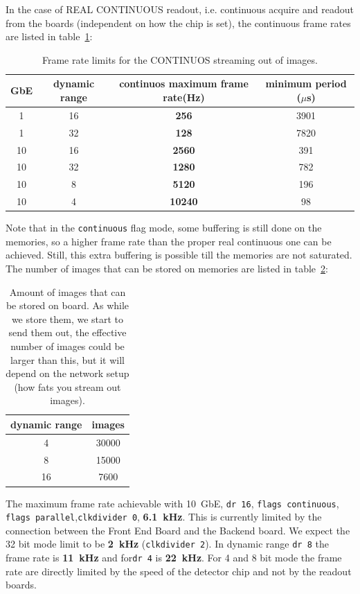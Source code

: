 \documentclass{article}
\begin{document}
In the case of REAL CONTINUOUS readout, i.e. continuous acquire and readout from the boards (independent on how the chip is set), the continuous frame rates are listed in table~\ref{tcont}:
\begin{table} 
\begin{tabular}{|c|c|c|c|}
\hline
GbE & dynamic range & continuos maximum frame rate(Hz) & minimum period ($\mu$s)\\
\hline
1 & 16 &  \textbf{256} & 3901\\ 
\hline 
1 &  32 &  \textbf{128} & 7820\\
\hline 
10 & 16 & \textbf{2560} & 391\\  
\hline 
10 & 32 & \textbf{1280}& 782\\  
\hline 
10 & 8 & \textbf{5120} & 196\\
\hline
10 & 4 & \textbf{10240} & 98\\
\hline
\end{tabular}
\caption{Frame rate limits for the CONTINUOS streaming out of images.} 
\label{tcont}\end{table}
Note that in the {\tt{continuous}} flag mode, some buffering is still done on the memories, so a higher frame rate than the proper real continuous one can be achieved. Still, this extra buffering is possible till the memories are not saturated. 
The number of images that can be stored on memories are listed in table~\ref{timgs}:
\begin{table}
\begin{tabular}{|c|c|}
\hline
dynamic range & images\\
\hline
4 & 30000\\
\hline
8 & 15000\\
\hline
16 & 7600\\
\hline
\end{tabular}
\caption{Amount of images that can be stored on board. As while we store them, we start to send them out, the effective number of images could be larger than this, but it will depend on the network setup (how fats you stream out images).}
\label{timgs}
\end{table}

The maximum frame rate achievable with 10~GbE, {\tt{dr 16}}, {\tt{flags continuous}}, {\tt{flags parallel}},{\tt{clkdivider 0}}, \textbf{6.1~kHz}. This is currently limited by the connection between the Front End Board and the Backend board. We expect the 32 bit mode limit to be \textbf{2~kHz} ({\tt{clkdivider 2}}).
 In dynamic range {\tt{dr 8}} the frame rate is \textbf{11~kHz} and for{\tt{dr 4}} is \textbf{22~kHz}. For 4 and 8 bit mode the frame rate are directly limited by the speed of the detector chip and not by the readout boards.    
\end{document}
